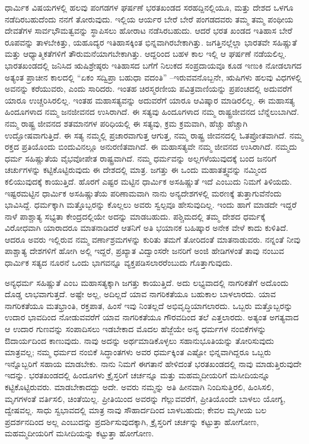 ಧಾರ್ಮಿಕ ವಿಷಯಗಳಲ್ಲಿ ಹಲವು ಪಂಗಡಗಳ ಘರ್ಷಣೆ ಭರತಖಂಡದ ಸರಹದ್ದಿನಲ್ಲಿಯೂ, ಮತ್ತು ದೇಶದ ಒಳಗೂ ನಡೆದಿರಬಹುದೆಂದು ನನಗೆ ತೋರುವುದು. ಇಲ್ಲಿಯ ಆರ್ಯರ ಬೇರೆ ಬೇರೆ ಪಂಗಡದವರು ತಮ್ಮ ತಮ್ಮ ಪಂಥೀಯ ದೇವತೆಗಳ ಸಾರ್ವಭೌಮತ್ವವನ್ನು ಸ್ಥಾಪಿಸಲು ಹೋರಾಟ ನಡೆಸಿರಬಹುದು. ಆದರೆ ಭರತ ಖಂಡದ ಇತಿಹಾಸ ಬೇರೆ ರೂಪವನ್ನು ತಾಳಬೇಕಿತ್ತು, ಯಹೂದ್ಯರ ಇತಿಹಾಸಕ್ಕಿಂತ ಭಿನ್ನವಾಗಿರಬೇಕಾಗಿತ್ತು. ಜಗತ್ತಿನಲ್ಲೆಲ್ಲಾ ಭಾರತವೇ ಸಹಿಷ್ಣುತೆ ಮತ್ತು ಆಧ್ಯಾತ್ಮಿಕತೆಗಳಿಗೆ ತೌರುಮನೆಯಾಗಬೇಕಾಗಿತ್ತು. ಆದ್ದರಿಂದ ಬಹಳ ಕಾಲ ಇಲ್ಲಿ ಆ ಘರ್ಷಣೆ ನಡೆಯಲಿಲ್ಲ. ಭಾರತಖಂಡದಲ್ಲಿ ಜನಿಸಿದ ಋಷಿಶ್ರೇಷ್ಠರು ಇತಿಹಾಸದ ಬಗೆಗೆ ನಿಲುಕದ ಸಂಪ್ರದಾಯವೂ ಕೂಡ ಇಣುಕಿ ನೋಡಲಾಗದ ಅತ್ಯಂತ ಪ್ರಾಚೀನ ಕಾಲದಲ್ಲಿ “ಏಕಂ ಸದ್ವಿಪ್ರಾ ಬಹುಧಾ ವದಂತಿ” –ಇರುವವನೊಬ್ಬನೇ, ಋಷಿಗಳು ಹಲವು ವಿಧಗಳಲ್ಲಿ ಅವನನ್ನು ಕರೆಯುವರು, ಎಂದು ಸಾರಿದರು. ಇಂತಹ ಚಿರಸ್ಮರಣೀಯ ಪವಿತ್ರವಾಣಿಯನ್ನು ಪ್ರಪಂಚದಲ್ಲಿ ಅದುವರೆಗೆ ಯಾರೂ ಉಚ್ಚರಿಸಿರಲಿಲ್ಲ. ಇಂತಹ ಮಹಾಸತ್ಯವನ್ನು ಅದುವರೆಗೆ ಯಾರೂ ಆವಿಷ್ಕಾರ ಮಾಡಿರಲಿಲ್ಲ. ಈ ಮಹಾಸತ್ಯ ಹಿಂದೂಗಳಾದ ನಮ್ಮ ಜನಜೀವನದ ಉಸಿರಾಗಿದೆ. ಈ ಸತ್ಯವು ಹಿಂದೂಗಳಾದ ನಮ್ಮ ರಾಷ್ಟ್ರಜೀವನದ ಬೆನ್ನೆಲುಬಾಗಿದೆ. ನಮ್ಮ ರಾಷ್ಟ್ರ ಜೀವನದ ಶತಮಾನಗಳ ಪರಿಧಿಯಲ್ಲಿ ಈ ಸತ್ಯವು, ಕ್ರಮ ಕ್ರಮವಾಗಿ, ಹೆಚ್ಚು ಹೆಚ್ಚಾಗಿ ಉದ್ಘೋಷವಾಗುತ್ತಿದೆ. ಈ ಸತ್ಯ ನಮ್ಮಲ್ಲಿ ಪ್ರಚಾರವಾಗುತ್ತ ಆಗುತ್ತ, ನಮ್ಮ ರಾಷ್ಟ್ರ ಜೀವನದಲ್ಲಿ ಓತಪ್ರೋತವಾಗಿದೆ. ನಮ್ಮ ರಕ್ತದ ಪ್ರತಿಯೊಂದು ಬಿಂದುವಿನಲ್ಲೂ ಅನುರಣಿತವಾಗಿದೆ. ಈ ಮಹಾಸತ್ಯವೇ ನಮ್ಮ ಜೀವನದ ಉಸಿರಾಗಿದೆ. ನಮ್ಮದು ಧರ್ಮ ಸಹಿಷ್ಣುತೆಯ ವೈಭವೋಪೇತ ರಾಷ್ಟ್ರವಾಗಿದೆ. ನಮ್ಮ ಧರ್ಮವನ್ನು ಅಲ್ಲಗಳೆಯುವುದಕ್ಕೆ ಬಂದ ಜನರಿಗೆ ಚರ್ಚುಗಳನ್ನು ಕಟ್ಟಿಕೊಟ್ಟಿರುವುದು ಈ ದೇಶದಲ್ಲಿ ಮಾತ್ರ. ಜಗತ್ತು ಈ ಒಂದು ಮಹಾತತ್ತ್ವವನ್ನು ನಮ್ಮಿಂದ ಕಲಿಯುವುದಕ್ಕೆ ಕಾಯುತ್ತಿದೆ. ಹೊರಗೆ ಎಷ್ಟರ ಮಟ್ಟಿನ ಧಾರ್ಮಿಕ ಅಸಹಿಷ್ಣುತೆ ಇದೆ ಎಂಬುದು ನಿಮಗೆ ತಿಳಿಯದು. ಇಷ್ಟರಮಟ್ಟಿನ ಧಾರ್ಮಿಕ ಅಸಹಿಷ್ಣುತೆಯ ಪರಿಣಾಮವಾಗಿ ನಾನು ಅನ್ಯದೇಶಗಳಲ್ಲಿ ಮರಣಕ್ಕೆ ತುತ್ತಾಗುವೆನೆಂದು ಭಾವಿಸಿದ್ದೆ. ಧರ್ಮಕ್ಕಾಗಿ ಮತ್ತೊಬ್ಬರನ್ನು ಕೊಲ್ಲಲು ಅವರು ಸ್ವಲ್ಪವೂ ಹೇಸುವುದಿಲ್ಲ. ಇಂದು ಹಾಗೆ ಮಾಡದೇ ಇದ್ದರೆ ನಾಳೆ ಪಾಶ್ಚಾತ್ಯ ಸಭ್ಯತಾ ಕೇಂದ್ರದಲ್ಲಿಯೇ ಅದನ್ನು ಮಾಡಬಹುದು. ಪಶ್ಚಿಮದಲ್ಲಿ ತಮ್ಮ ದೇಶದ ಧರ್ಮಕ್ಕೆ ವಿರೋಧವಾಗಿ ಯಾರಾದರೂ ಮಾತನಾಡಿದರೆ ಆತನಿಗೆ ಅತಿ ಭಯಾನಕ ಬಹಿಷ್ಕಾರ ಅನೇಕ ವೇಳೆ ಕಾದು ಕುಳಿತಿದೆ. ಆದರೂ ಅವರು ಇಲ್ಲಿರುವ ನಮ್ಮ ವರ್ಣಾಶ್ರಮಗಳನ್ನು ಕುರಿತು ತಮಗೆ ತೋರಿದಂತೆ ಮಾತನಾಡುವರು. ನನ್ನಂತೆ ನೀವು ಪಾಶ್ಚಾತ್ಯ ದೇಶಗಳಿಗೆ ಹೋಗಿ ಅಲ್ಲಿ ಇದ್ದರೆ, ಪ್ರಖ್ಯಾತ ವಿದ್ವಾಂಸರೇ ಜನರಿಗೆ ಅಂಜಿ ಹೇಡಿಗಳಂತೆ ತಾವು ನಂಬುವ ಧಾರ್ಮಿಕ ಸತ್ಯದ ನೂರನೆ ಒಂದು ಭಾಗವನ್ನೂ ವ್ಯಕ್ತಪಡಿಸಲಾರರೆಂಬುದು ಗೊತ್ತಾಗುವುದು.



ಅನ್ಯಧರ್ಮ ಸಹಿಷ್ಣುತೆ ಎಂಬ ಮಹಾಸತ್ಯಕ್ಕಾಗಿ ಜಗತ್ತು ಕಾಯುತ್ತಿದೆ. ಅದು ಲಭ್ಯವಾದಲ್ಲಿ ನಾಗರಿಕತೆಗೆ ಅದೊಂದು ದೊಡ್ಡ ಲಾಭವಾಗುತ್ತದೆ. ಅಷ್ಟೇ ಅಲ್ಲ, ಅದಿಲ್ಲದೆ ಯಾವ ನಾಗರಿಕತೆಯೂ ಬಹುಕಾಲ ಬಾಳಲಾರದು. ಯಾವ ನಾಗರಿಕತೆಯೂ ಮತಭ್ರಾಂತಿ, ರಕ್ತಪಾತ, ಹಿಂಸೆ ಇವು ನಿಂತಲ್ಲದೆ ಅಭಿವೃದ್ಧಿಯಾಗಲಾರದು. ಒಬ್ಬರು ಮತ್ತೊಬ್ಬರನ್ನು ಉದಾರ ಭಾವದಿಂದ ನೋಡುವವರೆಗೆ ಯಾವ ನಾಗರಿಕತೆಯೂ ಗೌರವದಿಂದ ತಲೆ ಎತ್ತಲಾರದು. ಅತ್ಯಂತ ಅಗತ್ಯವಾದ ಆ ಉದಾರ ಗುಣವನ್ನು ಸಂಪಾದಿಸಲು ಇಡಬೇಕಾದ ಮೊದಲ ಹೆಜ್ಜೆಯೇ ಅನ್ಯ ಧರ್ಮಗಳ ನಂಬಿಕೆಗಳನ್ನು ಔದಾರ್ಯದಿಂದ ಕಾಣುವುದು. ನಾವು ಅದನ್ನು ಅರ್ಥಮಾಡಿಕೊಳ್ಳಲು ಸಹಾನುಭೂತಿಯನ್ನು ತೋರಿಸುವುದು ಮಾತ್ರವಲ್ಲ; ನಮ್ಮ ಧರ್ಮದ ನಂಬಿಕೆ ಸಿದ್ಧಾಂತಗಳು ಅವರ ಧರ್ಮಕ್ಕಿಂತ ಎಷ್ಟೋ ಭಿನ್ನವಾಗಿದ್ದರೂ ಒಬ್ಬರು ಇನ್ನೊಬ್ಬರಿಗೆ ಸಹಾಯ ಮಾಡಬೇಕು. ನಾನು ನಿಮಗೆ ಈಗತಾನೆ ಹೇಳಿದಂತೆ ಭರತಖಂಡದಲ್ಲಿ ನಾವು ಮಾಡುತ್ತಿರುವುದೇ ಇದನ್ನು. ಭರತಖಂಡದಲ್ಲಿ ಹಿಂದೂಗಳು ಕ್ರೈಸ್ತರಿಗೆ ಚರ್ಚನ್ನೂ ಮತ್ತು ಮಹಮ್ಮದೀಯರಿಗೆ ಮಸೀದಿಯನ್ನೂ ಕಟ್ಟಿಕೊಟ್ಟಿರುವರು. ಮಾಡಬೇಕಾದದ್ದು ಅದೇ. ಅವರು ನಮ್ಮನ್ನು ಅತಿ ಹೀನವಾಗಿ ನಿಂದಿಸುತ್ತಿರಲಿ, ಹಿಂಸಿಸಲಿ, ಮೃಗಗಳಂತೆ ವರ್ತಿಸಲಿ, ಚಿಂತೆಯಿಲ್ಲ. ಪ್ರೀತಿಯಿಂದ ಅವರನ್ನು ಗೆಲ್ಲುವವರೆಗೆ, ಪ್ರೀತಿಯೊಂದೇ ಬಾಳಲು ಯೋಗ್ಯ, ದ್ವೇಷವಲ್ಲ. ಸಾಧು ಸ್ವಭಾವದಲ್ಲಿ ಮಾತ್ರ ನಾವು ಸೌಹಾರ್ದದಿಂದ ಬಾಳಬಹುದು; ಕೇವಲ ಮೃಗೀಯ ಬಲ ಪ್ರದರ್ಶನದಿಂದ ಅಲ್ಲ ಎಂಬುದನ್ನು ಪ್ರದರ್ಶಿಸುವುದಕ್ಕಾಗಿ, ಕ್ರೈಸ್ತರಿಗೆ ಚರ್ಚನ್ನು ಕಟ್ಟುತ್ತಾ ಹೋಗೋಣ, ಮಹಮ್ಮದೀಯರಿಗೆ ಮಸೀದಿಯನ್ನು ಕಟ್ಟುತ್ತಾ ಹೋಗೋಣ.

